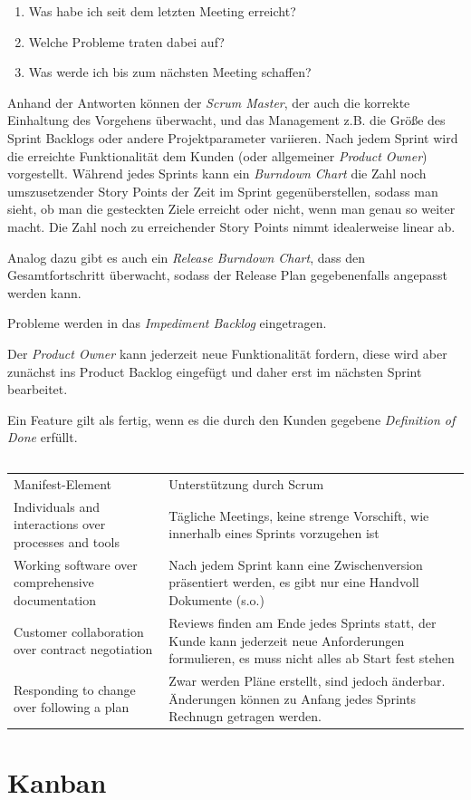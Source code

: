 \documentclass{scrartcl}
\begin{document}
\begin{enumerate}
   \item Was habe ich seit dem letzten Meeting erreicht?
   \item Welche Probleme traten dabei auf?
   \item Was werde ich bis zum nächsten Meeting schaffen?
\end{enumerate}

Anhand der Antworten können der \emph{Scrum Master}, der auch die korrekte
Einhaltung des Vorgehens überwacht, und das Management z.B. die Größe des Sprint
Backlogs oder andere Projektparameter variieren. Nach jedem Sprint wird die
erreichte Funktionalität dem Kunden (oder allgemeiner \emph{Product Owner})
vorgestellt. Während jedes Sprints kann ein \emph{Burndown Chart} die Zahl noch
umszusetzender Story Points der Zeit im Sprint gegenüberstellen, sodass man
sieht, ob man die gesteckten Ziele erreicht oder nicht, wenn man genau so weiter
macht. Die Zahl noch zu erreichender Story Points nimmt idealerweise linear ab.

Analog dazu gibt es auch ein \emph{Release Burndown Chart}, dass den
Gesamtfortschritt überwacht, sodass der Release Plan gegebenenfalls angepasst
werden kann.   

Probleme werden in das \emph{Impediment Backlog} eingetragen.

Der \emph{Product Owner} kann jederzeit neue Funktionalität fordern, diese wird
aber zunächst ins Product Backlog eingefügt und daher erst im nächsten Sprint
bearbeitet.

Ein Feature gilt als fertig, wenn es die durch den Kunden gegebene
\emph{Definition of Done} erfüllt.

\subsection{}

\begin{center}
   \begin{tabular}{ll}
      Manifest-Element & Unterstützung durch Scrum \\
      Individuals and interactions over processes and tools & Tägliche Meetings,
      keine strenge Vorschift, wie innerhalb eines Sprints vorzugehen ist \\
      Working software over comprehensive documentation & Nach jedem Sprint kann
      eine Zwischenversion präsentiert werden, es gibt nur eine Handvoll
      Dokumente (s.o.) \\
      Customer collaboration over contract negotiation & Reviews finden am Ende
      jedes Sprints statt, der Kunde kann jederzeit neue Anforderungen
      formulieren, es muss nicht alles ab Start fest stehen \\
      Responding to change over following a plan & Zwar werden Pläne erstellt,
      sind jedoch änderbar. Änderungen können zu Anfang jedes Sprints Rechnugn
      getragen werden.

   \end{tabular}
\end{center}
\section{Kanban}
\end{document}
